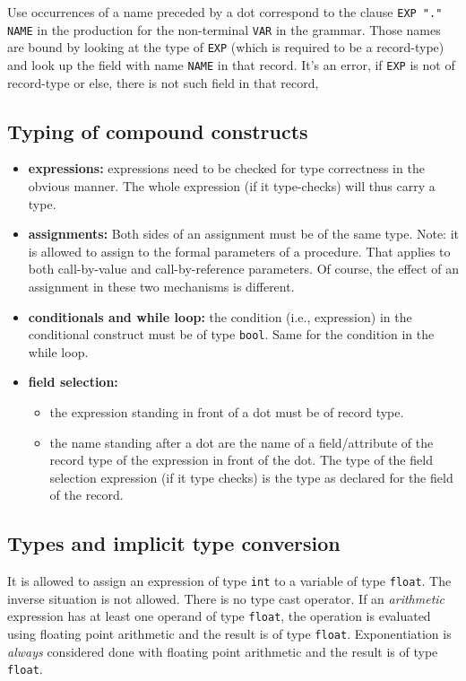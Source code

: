 \documentclass[11pt]{article}
\begin{document}
Use occurrences of a name preceded  by a dot correspond to the clause \texttt{EXP
"." NAME} in the production for the non-terminal \texttt{VAR} in the grammar.
Those names are bound by looking at the type of \texttt{EXP} (which is required to
be a record-type) and look up the field with name \texttt{NAME} in that record. It's
an error, if \texttt{EXP} is not of record-type or else, there is not such field in
that record,


\subsection{Typing of compound constructs}
\label{sec:org7f6f0f8}



\begin{itemize}
\item \textbf{expressions:} expressions need to be checked for type correctness in the
obvious manner. The whole expression (if it type-checks) will thus
carry a type.
\item \textbf{assignments:} Both sides of an assignment must be of the same type.
Note: it is allowed to assign to the formal parameters of a
procedure. That applies to both call-by-value and call-by-reference
parameters. Of course, the effect of an assignment in these two
mechanisms is different.
\item \textbf{conditionals and while loop:} the condition (i.e., expression) in the
conditional construct must be of type \texttt{bool}. Same for the condition in
the while loop.
\item \textbf{field selection:}
\begin{itemize}
\item the expression standing in front of a dot must be of record type.
\item the name standing after a dot are the name of a field/attribute of the
record type of the expression in front of the dot. The type of the field
selection expression (if it type checks) is the type as declared for
the field of the record.
\end{itemize}
\end{itemize}


\subsection{Types and implicit type conversion}
\label{sec:org9c8eeeb}

It is allowed to assign an expression of type \texttt{int} to a variable of type
\texttt{float}. The inverse situation is not allowed. There is no type cast
operator. If an \emph{arithmetic} expression has at least one operand of type
\texttt{float}, the operation is evaluated using floating point arithmetic and the
result is of type \texttt{float}. Exponentiation is \emph{always} considered done with
floating point arithmetic and the result is of type \texttt{float}.
\end{document}
